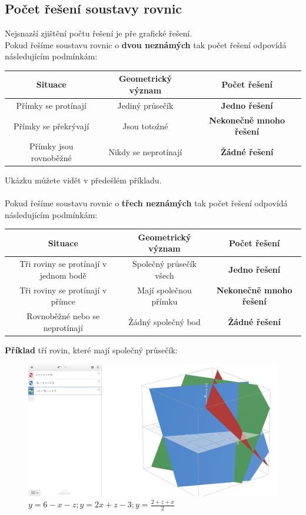     \subsection{Počet řešení soustavy rovnic}
Nejsnazší zjištění počtu řešení je pře grafické řešení.\\
Pokud řešíme soustavu rovnic o \textbf{dvou neznámých} tak počet řešení odpovídá následujícím podmínkám:
 \begin{center}
            \begin{tabular}{||c| c|c||} 
             \hline
             \textbf{Situace} & \textbf{Geometrický význam} & \textbf{Počet řešení} \\ [0.5ex] 
             \hline\hline
             Přímky se protínají & Jediný průsečík & \textbf{Jedno řešení} \\
             \hline
             Přímky se překrývají & Jsou totožné & \textbf{Nekonečně mnoho řešení} \\
             \hline
             Přímky jsou rovnoběžné & Nikdy se neprotínají & \textbf{Žádné řešení}\\
             \hline
            \end{tabular}
            \end{center}
Ukázku můžete vidět v předešlém příkladu.\\\\
Pokud řešíme soustavu rovnic o \textbf{třech neznámých} tak počet řešení odpovídá následujícím podmínkám:
\begin{center}
            \begin{tabular}{||c| c|c||} 
             \hline
             \textbf{Situace} & \textbf{Geometrický význam} & \textbf{Počet řešení} \\ [0.5ex] 
             \hline\hline
             Tři roviny se protínají v jednom bodě & Společný průsečík všech & \textbf{Jedno řešení} \\
             \hline
             Tři roviny se protínají v přímce & Mají společnou přímku & \textbf{Nekonečně mnoho řešení} \\
             \hline
             Rovnoběžné nebo se neprotínají & Žádný společný bod & \textbf{Žádné řešení}\\
             \hline
            \end{tabular}
            \end{center}
\textbf{Příklad} tří rovin, které mají společný průsečík:
\begin{figure}[H]
        \centering
        \includegraphics[width=0.5\linewidth]{img/4_soustava_rovnic_o_trech_neznamych.png}
        \caption{$y=6-x-z;y=2x+z-3;y=\frac{2+z+x}{2}$} 
        \label{fig:enter-label}
    \end{figure}